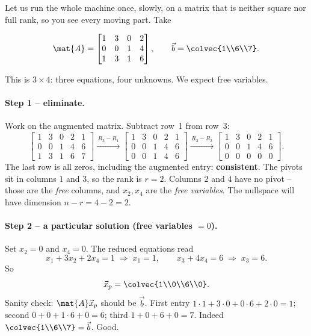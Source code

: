 Let us run the whole machine once, slowly, on a matrix that is neither square nor full
rank, so you see every moving part. Take

\[
  \mat{A}=\begin{bmatrix}1&3&0&2\\0&0&1&4\\1&3&1&6\end{bmatrix},
  \qquad
  \vec{b}=\colvec{1\\6\\7}.
\]

This is $3\times4$: three equations, four unknowns. We expect free variables.

\paragraph{Step 1 -- eliminate.} Work on the augmented matrix. Subtract row~1 from row~3:
\[
  \left[\begin{array}{cccc|c}
    1&3&0&2&1\\ 0&0&1&4&6\\ 1&3&1&6&7
  \end{array}\right]
  \xrightarrow{\,R_3-R_1\,}
  \left[\begin{array}{cccc|c}
    1&3&0&2&1\\ 0&0&1&4&6\\ 0&0&1&4&6
  \end{array}\right]
  \xrightarrow{\,R_3-R_2\,}
  \left[\begin{array}{cccc|c}
    1&3&0&2&1\\ 0&0&1&4&6\\ 0&0&0&0&0
  \end{array}\right].
\]
The last row is all zeros, including the augmented entry: \textbf{consistent}. The pivots
sit in columns $1$ and $3$, so the rank is $r=2$. Columns $2$ and $4$ have no pivot --
those are the \emph{free} columns, and $x_2,x_4$ are the \emph{free variables}. The
nullspace will have dimension $n-r=4-2=2$.

\paragraph{Step 2 -- a particular solution (free variables $=0$).} Set $x_2=0$ and
$x_4=0$. The reduced equations read
\[
  x_1+3x_2+2x_4 = 1 \;\Rightarrow\; x_1=1,\qquad
  x_3+4x_4 = 6 \;\Rightarrow\; x_3=6.
\]
So
\[
  \vec{x}_p=\colvec{1\\0\\6\\0}.
\]
Sanity check: $\mat{A}\vec{x}_p$ should be $\vec{b}$. First entry
$1\cdot1+3\cdot0+0\cdot6+2\cdot0=1$; second $0+0+1\cdot6+0=6$; third
$1+0+6+0=7$. Indeed $\colvec{1\\6\\7}=\vec b$. Good.


